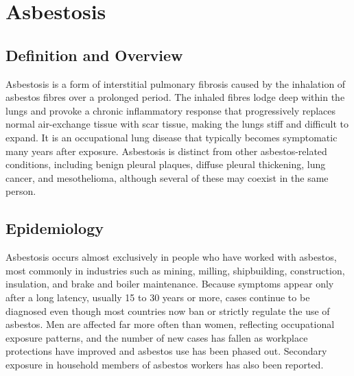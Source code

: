 \chapter{Asbestosis}

\section*{Definition and Overview}
Asbestosis is a form of interstitial pulmonary fibrosis caused by the inhalation of asbestos fibres over a prolonged period. The inhaled fibres lodge deep within the lungs and provoke a chronic inflammatory response that progressively replaces normal air-exchange tissue with scar tissue, making the lungs stiff and difficult to expand. It is an occupational lung disease that typically becomes symptomatic many years after exposure. Asbestosis is distinct from other asbestos-related conditions, including benign pleural plaques, diffuse pleural thickening, lung cancer, and mesothelioma, although several of these may coexist in the same person.

\section*{Epidemiology}
Asbestosis occurs almost exclusively in people who have worked with asbestos, most commonly in industries such as mining, milling, shipbuilding, construction, insulation, and brake and boiler maintenance. Because symptoms appear only after a long latency, usually 15 to 30 years or more, cases continue to be diagnosed even though most countries now ban or strictly regulate the use of asbestos. Men are affected far more often than women, reflecting occupational exposure patterns, and the number of new cases has fallen as workplace protections have improved and asbestos use has been phased out. Secondary exposure in household members of asbestos workers has also been reported.

